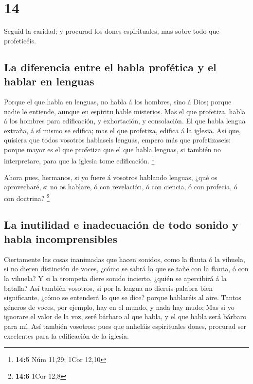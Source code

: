 \hypertarget{section-13}{%
\section{14}\label{section-13}}

 Seguid la caridad; y procurad los dones espirituales, mas
sobre todo que profeticéis.

\hypertarget{la-diferencia-entre-el-habla-profuxe9tica-y-el-hablar-en-lenguas}{%
\subsection{La diferencia entre el habla profética y el hablar en
lenguas}\label{la-diferencia-entre-el-habla-profuxe9tica-y-el-hablar-en-lenguas}}

 Porque el que habla en lenguas, no habla á los hombres,
sino á Dios; porque nadie le entiende, aunque en espíritu hable
misterios.  Mas el que profetiza, habla á los hombres para
edificación, y exhortación, y consolación.  El que habla
lengua extraña, á sí mismo se edifica; mas el que profetiza, edifica á
la iglesia.  Así que, quisiera que todos vosotros
hablaseis lenguas, empero más que profetizaseis: porque mayor es el que
profetiza que el que habla lenguas, si también no interpretare, para que
la iglesia tome edificación. \footnote{\textbf{14:5} Núm 11,29; 1Cor
  12,10}

 Ahora pues, hermanos, si yo fuere á vosotros hablando
lenguas, ¿qué os aprovecharé, si no os hablare, ó con revelación, ó con
ciencia, ó con profecía, ó con doctrina? \footnote{\textbf{14:6} 1Cor
  12,8}

\hypertarget{la-inutilidad-e-inadecuaciuxf3n-de-todo-sonido-y-habla-incomprensibles}{%
\subsection{La inutilidad e inadecuación de todo sonido y habla
incomprensibles}\label{la-inutilidad-e-inadecuaciuxf3n-de-todo-sonido-y-habla-incomprensibles}}

 Ciertamente las cosas inanimadas que hacen sonidos, como
la flauta ó la vihuela, si no dieren distinción de voces, ¿cómo se sabrá
lo que se tañe con la flauta, ó con la vihuela?  Y si la
trompeta diere sonido incierto, ¿quién se apercibirá á la batalla?
 Así también vosotros, si por la lengua no diereis palabra
bien significante, ¿cómo se entenderá lo que se dice? porque hablaréis
al aire.  Tantos géneros de voces, por ejemplo, hay en el
mundo, y nada hay mudo;  Mas si yo ignorare el valor de
la voz, seré bárbaro al que habla, y el que habla será bárbaro para mí.
 Así también vosotros; pues que anheláis espirituales
dones, procurad ser excelentes para la edificación de la iglesia.

